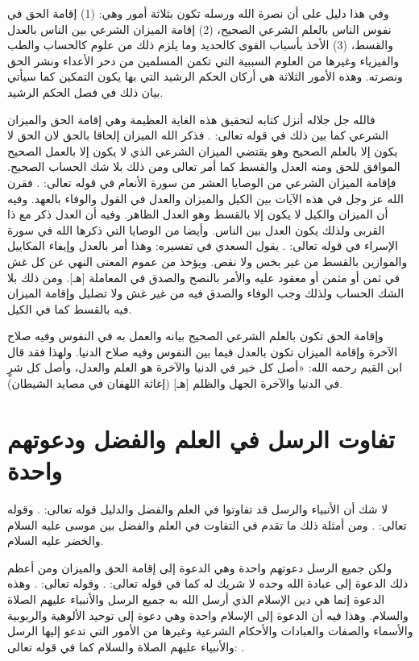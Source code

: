  وفي هذا دليل على أن نصرة الله ورسله تكون بثلاثة أمور وهي: (1) إقامة الحق في نفوس الناس بالعلم الشرعي الصحيح، (2) إقامة الميزان الشرعي بين الناس بالعدل والقسط، (3) الأخذ بأسباب القوى كالحديد وما يلزم ذلك من علوم كالحساب والطب والفيزياء وغيرها من العلوم السببية التي تكمن المسلمين من دحر الأعداء ونشر الحق ونصرته. وهذه الأمور الثلاثة هي أركان الحكم الرشيد التي بها يكون التمكين كما سيأتي بيان ذلك في فصل الحكم الرشيد.

فالله جل جلاله أنزل كتابه لتحقيق هذه الغاية العظيمة وهي إقامة الحق والميزان الشرعي كما بين ذلك في قوله تعالى:
\quranayah*[42][17]{\footnotesize \surahname*[42]}.
فذكر الله الميزان إلحاقا بالحق لان الحق لا يكون إلا بالعلم الصحيح وهو يقتضي الميزان الشرعي الذي لا يكون إلا بالعمل الصحيح الموافق للحق ومنه العدل والقسط كما أمر تعالى ومن ذلك بلا شك الحساب الصحيح. فإقامة الميزان الشرعي من الوصايا العشر من سورة الأنعام في قوله تعالى:
\quranayah*[6][152][12]{\footnotesize \surahname*[6]}. فقرن الله عز وجل في هذه الآيات بين الكيل والميزان والعدل في القول والوفاء بالعهد. وفيه أن الميزان والكيل لا يكون إلا بالقسط وهو العدل الظاهر. وفيه أن العدل ذكر مع ذا القربى ولذلك يكون العدل بين الناس.
وأيضا من الوصايا التي ذكرها الله في سورة الإسراء في قوله تعالى:
\quranayah*[17][35]{\footnotesize \surahname*[17]}. يقول السعدي في تفسيره:
وهذا أمر بالعدل وإيفاء المكاييل والموازين بالقسط من غير بخس ولا نقص. ويؤخذ من عموم المعنى النهي عن كل غش في ثمن أو مثمن أو معقود عليه والأمر بالنصح والصدق في المعاملة [هـ]. ومن ذلك بلا الشك الحساب ولذلك وجب الوفاء والصدق فيه من غير غش ولا تضليل وإقامة الميزان فيه بالقسط كما في الكيل.

وإقامة الحق تكون بالعلم الشرعي الصحيح بيانه والعمل به في النفوس وفيه صلاح الآخرة وإقامة الميزان تكون بالعدل فيما بين النفوس وفيه صلاح الدنيا. ولهذا فقد قال ابن القيم رحمه الله: «أصل كل خير في الدنيا والآخرة هو العلم والعدل، وأصل كل شرٍ في الدنيا والآخرة الجهل والظلم [هـ] {\footnotesize (إغاثة اللهفان في مصايد الشيطان)}.

\section{تفاوت الرسل في العلم والفضل ودعوتهم واحدة}

لا شك أن الأنبياء والرسل قد تفاوتوا في العلم والفضل والدليل قوله تعالى: 
\quranayah*[2][253]{\footnotesize \surahname*[2]}. وقوله تعالى:
\quranayah*[17][55]{\footnotesize \surahname*[17]}. ومن أمثلة ذلك ما تقدم في التفاوت في العلم والفضل بين موسى عليه السلام والخضر عليه السلام. 

ولكن جميع الرسل دعوتهم واحدة وهي الدعوة إلى إقامة الحق والميزان ومن أعظم ذلك الدعوة إلى عبادة الله وحده لا شريك له كما في قوله تعالى: 
\quranayah*[16][36]{\footnotesize \surahname*[16]}. وقوله تعالى:
\quranayah*[21][25]{\footnotesize \surahname*[21]}. وهذه الدعوة إنما هي دين الإسلام الذي أرسل الله به جميع الرسل والأنبياء عليهم الصلاة والسلام. وهذا فيه أن الدعوة إلى الإسلام واحدة وهي دعوة إلى توحيد الألوهية والربوبية والأسماء والصفات والعبادات والأحكام الشرعية وغيرها من الأمور التي تدعو إليها الرسل والأنبياء عليهم الصلاة والسلام كما في قوله تعالى: 
\quranayah*[42][13]{\footnotesize \surahname*[42]}.

